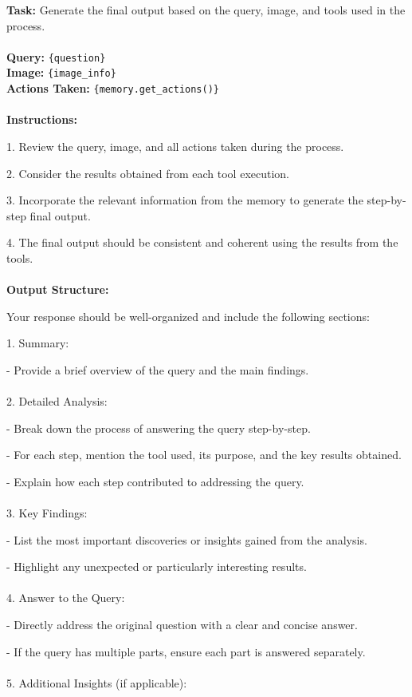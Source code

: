 \begin{textcolorbox}
\textbf{Task:} Generate the final output based on the query, image, and tools used in the process.
\\\\
\textbf{Query:} \texttt{\{question\}}
\\
\textbf{Image:} \texttt{\{image\_info\}}
\\
\textbf{Actions Taken:} \texttt{\{memory.get\_actions()\}}
\\\\
\textbf{Instructions:}

1. Review the query, image, and all actions taken during the process.

2. Consider the results obtained from each tool execution.

3. Incorporate the relevant information from the memory to generate the step-by-step final output.

4. The final output should be consistent and coherent using the results from the tools.
\\\\
\textbf{Output Structure:}

Your response should be well-organized and include the following sections:

1. Summary:

\quad - Provide a brief overview of the query and the main findings.
\\\\
2. Detailed Analysis:

\quad - Break down the process of answering the query step-by-step.

\quad - For each step, mention the tool used, its purpose, and the key results obtained.

\quad - Explain how each step contributed to addressing the query.
\\\\
3. Key Findings:

\quad - List the most important discoveries or insights gained from the analysis.

\quad - Highlight any unexpected or particularly interesting results.
\\\\
4. Answer to the Query:

\quad - Directly address the original question with a clear and concise answer.

\quad - If the query has multiple parts, ensure each part is answered separately.
\\\\
5. Additional Insights (if applicable):


\end{textcolorbox}
